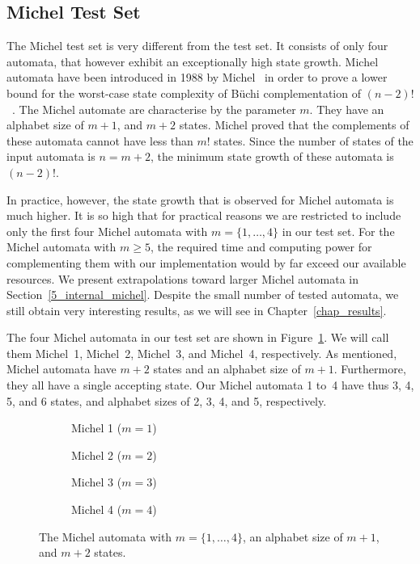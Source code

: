 \subsection{Michel Test Set}
\label{4_michel_testset}
The Michel test set is very different from the \goal{} test set. It consists of only four automata, that however exhibit an exceptionally high state growth. Michel automata have been introduced in 1988 by Michel~\cite{michel1988} in order to prove a lower bound for the worst-case state complexity of Büchi complementation of $(n-2)!$~\cite{1996_thomas}. The Michel automate are characterise by the parameter $m$. They have an alphabet size of $m+1$, and $m+2$ states. Michel proved that the complements of these automata cannot have less than $m!$ states. Since the number of states of the input automata is $n = m + 2$, the minimum state growth of these automata is $(n-2)!$.

In practice, however, the state growth that is observed for Michel automata is much higher. It is so high that for practical reasons we are restricted to include only the first four Michel automata with $m=\{1,\dots,4\}$ in our test set. For the Michel automata with $m \geq 5$, the required time and computing power for complementing them with our implementation would by far exceed our available resources. We present extrapolations toward larger Michel automata in Section~\ref{5_internal_michel}. Despite the small number of tested automata, we still obtain very interesting results, as we will see in Chapter~\ref{chap_results}.

The four Michel automata in our test set are shown in Figure~\ref{michel_automata}. We will call them Michel~1, Michel~2, Michel~3, and Michel~4, respectively. As mentioned, Michel automata have $m+2$ states and an alphabet size of $m+1$. Furthermore, they all have a single accepting state. Our Michel automata 1 to~4 have thus 3, 4, 5, and 6 states, and alphabet sizes of 2, 3, 4, and 5, respectively.

\renewcommand{\subwidth}{0.42}
\begin{figure}[htb!]
\centering
  \begin{subfigure}[t]{\subwidth\textwidth}
  \MichelOne
  \caption{Michel 1 ($m=1$)}
  \end{subfigure}
  \begin{subfigure}[t]{\subwidth\textwidth}
  \MichelTwo
  \caption{Michel 2 ($m=2$)}
  \end{subfigure}

  \begin{subfigure}[b]{\subwidth\textwidth}
  \MichelThree
  \caption{Michel 3 ($m=3$)}
  \end{subfigure}
  \begin{subfigure}[b]{\subwidth\textwidth}
  \MichelFour
  \caption{Michel 4 ($m=4$)}
  \end{subfigure}
\caption{The Michel automata with $m = \{1,\dots,4\}$, an alphabet size of $m+1$, and $m+2$ states.}
\label{michel_automata}
\end{figure}

